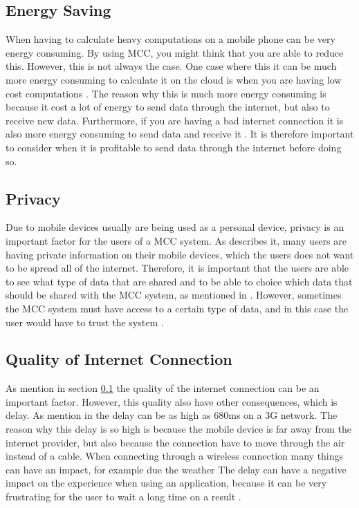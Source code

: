 
\subsection{Energy Saving}\label{EnergySaving}
When having to calculate heavy computations on a mobile phone can be very energy consuming.
By using MCC, you might think that you are able to reduce this.
However, this is not always the case.
One case where this it can be much more energy consuming to calculate it on the cloud is when you are having low cost computations \citep{goyalmobile,liu2013gearing,fernando2013mobile}.
The reason why this is much more energy consuming is because it cost a lot of energy to send data through the internet, but also to receive new data.
Furthermore, if you are having a bad internet connection it is also more energy consuming to send data and receive it \citep{goyalmobile,liu2013gearing,fernando2013mobile}.
It is therefore important to consider when it is profitable to send data through the internet before doing so.

\subsection{Privacy}
Due to mobile devices usually are being used as a personal device, privacy is an important factor for the users of a MCC system.
As \citet{liu2013gearing, fernando2013mobile} describes it, many users are having private information on their mobile devices, which the users does not want to be spread all of the internet.
Therefore, it is important that the users are able to see what type of data that are shared and to be able to choice which data that should be shared with the MCC system, as mentioned in \citet{sanaei2014heterogeneity}.
However, sometimes the MCC system must have access to a certain type of data, and in this case the user would have to trust the system \citep{fernando2013mobile}.

\subsection{Quality of Internet Connection}
As mention in section \ref{EnergySaving} the quality of the internet connection can be an important factor.
However, this quality also have other consequences, which is delay.
As mention in \citep{fernando2013mobile} the delay can be as high as 680ms on a 3G network.
The reason why this delay is so high is because the mobile device is far away from the internet provider, but also because the connection have to move through the air instead of a cable.
When connecting through a wireless connection many things can have an impact, for example due the weather \citep{dev2014review,kumar2013mobile}
The delay can have a negative impact on the experience when using an application, because it can be very frustrating for the user to wait a long time on a result \citep{hazarika2014mobile}.

